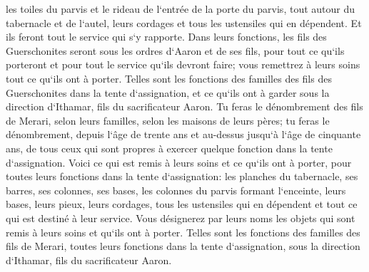 \verse les toiles du parvis et le rideau de l`entrée de la porte du parvis, tout autour du tabernacle et de l`autel, leurs cordages et tous les ustensiles qui en dépendent. Et ils feront tout le service qui s`y rapporte. 
\verse Dans leurs fonctions, les fils des Guerschonites seront sous les ordres d`Aaron et de ses fils, pour tout ce qu`ils porteront et pour tout le service qu`ils devront faire; vous remettrez à leurs soins tout ce qu`ils ont à porter. 
\verse Telles sont les fonctions des familles des fils des Guerschonites dans la tente d`assignation, et ce qu`ils ont à garder sous la direction d`Ithamar, fils du sacrificateur Aaron. 
\verse Tu feras le dénombrement des fils de Merari, selon leurs familles, selon les maisons de leurs pères; 
\verse tu feras le dénombrement, depuis l`âge de trente ans et au-dessus jusqu`à l`âge de cinquante ans, de tous ceux qui sont propres à exercer quelque fonction dans la tente d`assignation. 
\verse Voici ce qui est remis à leurs soins et ce qu`ils ont à porter, pour toutes leurs fonctions dans la tente d`assignation: les planches du tabernacle, ses barres, ses colonnes, ses bases, 
\verse les colonnes du parvis formant l`enceinte, leurs bases, leurs pieux, leurs cordages, tous les ustensiles qui en dépendent et tout ce qui est destiné à leur service. Vous désignerez par leurs noms les objets qui sont remis à leurs soins et qu`ils ont à porter. 
\verse Telles sont les fonctions des familles des fils de Merari, toutes leurs fonctions dans la tente d`assignation, sous la direction d`Ithamar, fils du sacrificateur Aaron. 
